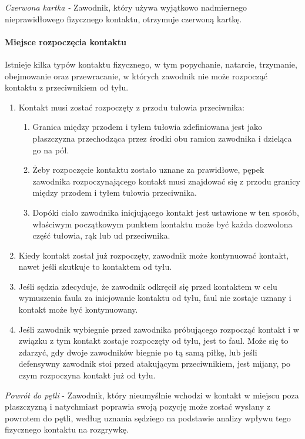 \documentclass[12pt]{article}
\begin{document}
\emph{Czerwona kartka -} Zawodnik, który używa wyjątkowo nadmiernego
nieprawidłowego fizycznego kontaktu, otrzymuje czerwoną kartkę.

\paragraph{Miejsce rozpoczęcia kontaktu}
Istnieje kilka typów
kontaktu fizycznego, w tym popychanie, natarcie, trzymanie, obejmowanie
oraz przewracanie, w których zawodnik nie może rozpocząć kontaktu z
przeciwnikiem od tyłu.

\begin{enumerate}
\item
    Kontakt musi zostać rozpoczęty z przodu tułowia przeciwnika:
  
  \begin{enumerate}
  \item
        Granica między przodem i tyłem tułowia zdefiniowana jest jako
    płaszczyzna przechodząca przez środki obu ramion zawodnika i
    dzieląca go na pół.
      \item
        Żeby rozpoczęcie kontaktu zostało uznane za prawidłowe, pępek
    zawodnika rozpoczynającego kontakt musi znajdować się z przodu
    granicy między przodem i tyłem tułowia przeciwnika.
      \item
        Dopóki ciało zawodnika inicjującego kontakt jest ustawione w ten
    sposób, właściwym początkowym punktem kontaktu może być każda
    dozwolona część tułowia, rąk lub ud przeciwnika.
      \end{enumerate}
\item
    Kiedy kontakt został już rozpoczęty, zawodnik może kontynuować
  kontakt, nawet jeśli skutkuje to kontaktem od tyłu.
  \item
    Jeśli sędzia zdecyduje, że zawodnik odkręcił się przed kontaktem w
  celu wymuszenia faula za inicjowanie kontaktu od tyłu, faul nie
  zostaje uznany i kontakt może być kontynuowany.
  \item
    Jeśli zawodnik wybiegnie przed zawodnika próbującego rozpocząć kontakt
  i w związku z tym kontakt zostaje rozpoczęty od tyłu, jest to faul.
  Może się to zdarzyć, gdy dwoje zawodników biegnie po tą samą piłkę,
  lub jeśli defensywny zawodnik stoi przed atakującym przeciwnikiem,
  jest mijany, po czym rozpoczyna kontakt już od tyłu.
  \end{enumerate}

\emph{Powrót do pętli} - Zawodnik, który nieumyślnie wchodzi w kontakt w
miejscu poza płaszczyzną i natychmiast poprawia swoją pozycję może
zostać wysłany z powrotem do pętli, według uznania sędziego na podstawie
analizy wpływu tego fizycznego kontaktu na rozgrywkę.
\end{document}
